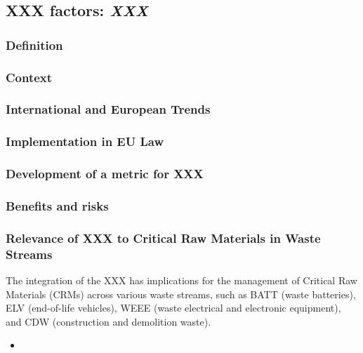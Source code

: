 \subsection{XXX factors: \textit{XXX}}

\subsubsection{Definition}

\subsubsection{Context}


\subsubsection{International and European Trends}

\subsubsection{Implementation in EU Law}


\subsubsection{Development of a metric for XXX}

\subsubsection{Benefits and risks}






\subsubsection{Relevance of XXX to Critical Raw Materials in Waste Streams}

The integration of the XXX has implications for the management of Critical Raw Materials
(CRMs) across various waste streams, such as BATT (waste batteries), ELV
(end-of-life vehicles), WEEE (waste electrical and electronic equipment), and
CDW (construction and demolition waste).

\wasteSubsubsecBATT
\begin{itemize}
    \item
\end{itemize}

